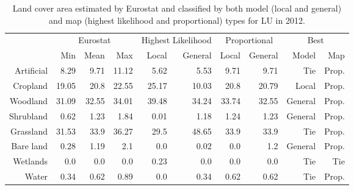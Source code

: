     \begin{table}[H]
    \centering
    \caption{Land cover area estimated by Eurostat and classified by both model (local and general) and map (highest likelihood and proportional) types for LU in 2012.}
    
    \begin{tabular}{r|rrr|rr|rr|rr}
    \toprule
    {} & \multicolumn{3}{|c}{Eurostat} & \multicolumn{2}{|c}{Highest Likelihood} & \multicolumn{2}{|c}{Proportional} & \multicolumn{2}{|c}{Best} \\
    {} &      Min &   Mean &    Max &              Local & General &        Local & General &    Model &    Map \\
    \midrule
    Artificial &     8.29 &   9.71 &  11.12 &               5.62 &    5.53 &         9.71 &    9.71 &      Tie &  Prop. \\
    Cropland   &    19.05 &   20.8 &  22.55 &              25.17 &   10.03 &         20.8 &   20.79 &    Local &  Prop. \\
    Woodland   &    31.09 &  32.55 &  34.01 &              39.48 &   34.24 &        33.74 &   32.55 &  General &  Prop. \\
    Shrubland  &     0.62 &   1.23 &   1.84 &               0.01 &    1.18 &         1.24 &    1.23 &  General &  Prop. \\
    Grassland  &    31.53 &   33.9 &  36.27 &               29.5 &   48.65 &         33.9 &    33.9 &      Tie &  Prop. \\
    Bare land  &     0.28 &   1.19 &    2.1 &                0.0 &    0.02 &          0.0 &     1.2 &  General &  Prop. \\
    Wetlands   &      0.0 &    0.0 &    0.0 &               0.23 &     0.0 &          0.0 &     0.0 &      Tie &    Tie \\
    Water      &     0.34 &   0.62 &   0.89 &                0.0 &    0.34 &         0.62 &    0.62 &      Tie &  Prop. \\
    \bottomrule
    \end{tabular}
    \end{table}
    
